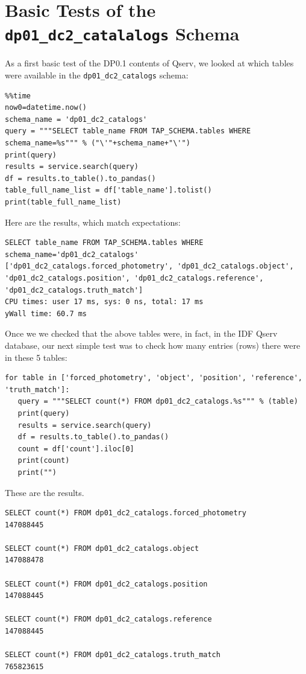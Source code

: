 \documentclass[DM,authoryear,toc]{lsstdoc}
\begin{document}
\section{Basic Tests of the \texttt{dp01\_dc2\_catalalogs} Schema} \label{sec:basic}

As a first basic test of the DP0.1 contents of Qserv, we looked at which tables were available in the
\texttt{dp01\_dc2\_catalogs} schema:

\lstset{language=Python}
\begin{lstlisting}
%%time
now0=datetime.now()
schema_name = 'dp01_dc2_catalogs'
query = """SELECT table_name FROM TAP_SCHEMA.tables WHERE schema_name=%s""" % ("\'"+schema_name+"\'")
print(query)
results = service.search(query)
df = results.to_table().to_pandas()
table_full_name_list = df['table_name'].tolist()
print(table_full_name_list)
\end{lstlisting}

Here are the results, which match expectations:

\lstset{language=Python}
\begin{lstlisting}
SELECT table_name FROM TAP_SCHEMA.tables WHERE schema_name='dp01_dc2_catalogs'
['dp01_dc2_catalogs.forced_photometry', 'dp01_dc2_catalogs.object', 'dp01_dc2_catalogs.position', 'dp01_dc2_catalogs.reference', 'dp01_dc2_catalogs.truth_match']
CPU times: user 17 ms, sys: 0 ns, total: 17 ms
yWall time: 60.7 ms
\end{lstlisting}


Once we we checked that the above tables were, in fact, in the IDF Qserv database, our next simple test was to check how many entries (rows) there were in these 5 tables: 


\lstset{language=Python}
\begin{lstlisting}
for table in ['forced_photometry', 'object', 'position', 'reference', 'truth_match']:
   query = """SELECT count(*) FROM dp01_dc2_catalogs.%s""" % (table)
   print(query)
   results = service.search(query)
   df = results.to_table().to_pandas()
   count = df['count'].iloc[0]
   print(count)
   print("")
\end{lstlisting}

These are the results.

\lstset{language=SQL}
\begin{lstlisting}
SELECT count(*) FROM dp01_dc2_catalogs.forced_photometry
147088445

SELECT count(*) FROM dp01_dc2_catalogs.object
147088478

SELECT count(*) FROM dp01_dc2_catalogs.position
147088445
 
SELECT count(*) FROM dp01_dc2_catalogs.reference
147088445

SELECT count(*) FROM dp01_dc2_catalogs.truth_match
765823615
\end{lstlisting}
\end{document}
